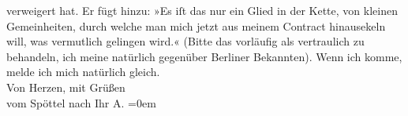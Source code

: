 \begin{ledgroupsized}[t]{13cm}
               verweigert hat. Er fügt hinzu: »Es iſt das nur ein Glied in der Kette, {\pb}von kleinen Gemeinheiten, durch welche man
               mich jetzt aus meinem Contract hinausekeln will, was vermutlich gelingen wird.«
               (Bitte das vorläufig als vertraulich zu behandeln, ich meine natürlich gegenüber Berliner Bekannten). \pend
           \pstart
           Wenn ich komme, melde ich mich natürlich gleich. {\\[\baselineskip]}Von Herzen, mit Grüßen
               {\\[\baselineskip]}vom Spöttel nach \label{K_L03002-56v}\label{K_L03002-56h} Ihr \spacefill\mbox{A.}\pend
           \leftskip=0em{}
         
         \endnumbering{}\end{ledgroupsized}\begin{anhang}\end{anhang}\newcommand{\dateiname}{L03002}\newcommand{\titel}{Arthur Schnitzler an Felix Salten, 30. 1. 1906}\newcommand{\editorInnen}{Martin Anton Müller und Laura Untner}
      